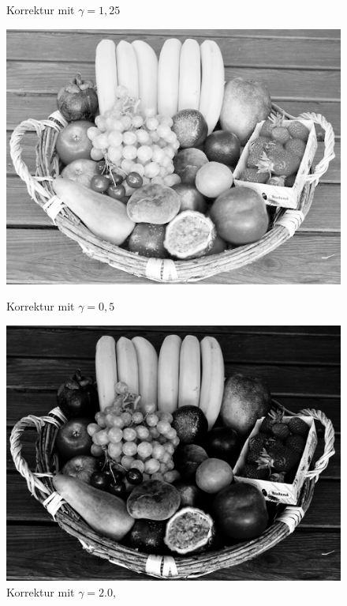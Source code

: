 \documentclass[course=erap]{aspdoc}
\begin{document}
\begin{figure}[h]
\begin{minipage}{0.49\linewidth}
			\caption{Korrektur mit $\gamma = 1,25$}
			\label{ObstkorbGamma1_25}
		\end{minipage}
		\begin{minipage}{0.49\linewidth}
			\centering
			\includegraphics[scale=1.2]{Images/fruit_basket_gamma_0,5.png}
			\caption{Korrektur mit $\gamma = 0,5$}
			\label{ObstkorbGamma0_5}
		\end{minipage}
		\centering
		\begin{minipage}{0.49\linewidth}
			\centering
			\includegraphics[scale=1.2]{Images/fruit_basket_gamma_2.png}
			\caption{Korrektur mit $\gamma = 2.0,$}
			\label{ObstkorbGamma2}
		\end{minipage}
	\end{figure}\\
\end{document}
